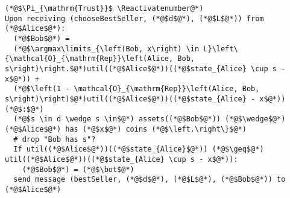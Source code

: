 \Suppressnumber
\begin{lstlisting}[label=trustprot, style=numbers]
(*@$\Pi_{\mathrm{Trust}}$ \Reactivatenumber@*)
Upon receiving (chooseBestSeller, (*@$d$@*), (*@$L$@*)) from (*@$Alice$@*):
  (*@$Bob$@*) =
  (*@$\argmax\limits_{\left(Bob, x\right) \in L}\left\{\mathcal{O}_{\mathrm{Rep}}\left(Alice, Bob, s\right)\right.$@*)util((*@$Alice$@*))((*@$state_{Alice} \cup s - x$@*)) +
  (*@$\left(1 - \mathcal{O}_{\mathrm{Rep}}\left(Alice, Bob, s\right)\right)$@*)util((*@$Alice$@*))((*@$state_{Alice} - x$@*)) (*@$:$@*)
  (*@$s \in d \wedge s \in$@*) assets((*@$Bob$@*)) (*@$\wedge$@*) (*@$Alice$@*) has (*@$x$@*) coins (*@$\left.\right\}$@*)
  # drop "Bob has s"?
  If util((*@$Alice$@*))((*@$state_{Alice}$@*)) (*@$\geq$@*) util((*@$Alice$@*))((*@$state_{Alice} \cup s - x$@*)):
    (*@$Bob$@*) = (*@$\bot$@*)
  send message (bestSeller, (*@$d$@*), (*@$L$@*), (*@$Bob$@*)) to (*@$Alice$@*)
\end{lstlisting}
